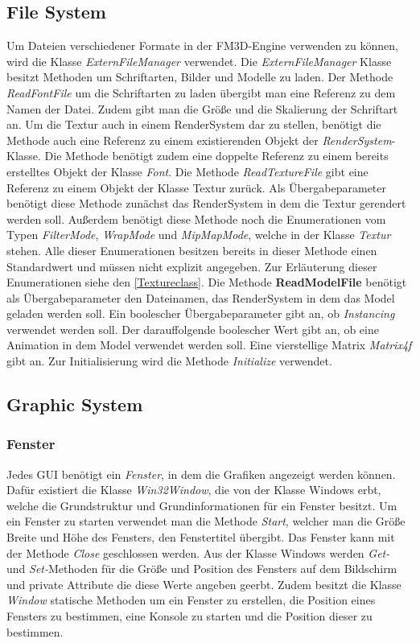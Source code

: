 \subsection{File System}
Um Dateien verschiedener Formate in der FM3D-Engine verwenden zu können, wird die Klasse \textit{ExternFileManager} verwendet.
Die \textit{ExternFileManager} Klasse besitzt Methoden um Schriftarten, Bilder und Modelle zu laden. Der Methode \textit{ReadFontFile} um die Schriftarten zu laden übergibt man eine Referenz zu dem Namen der Datei. Zudem gibt man die Größe und die Skalierung der Schriftart an. Um die Textur auch in einem RenderSystem dar zu stellen, benötigt die Methode auch eine Referenz zu einem existierenden Objekt der \textit{RenderSystem}-Klasse. Die Methode benötigt zudem eine doppelte Referenz zu einem bereits erstelltes Objekt der Klasse \textit{Font}. 
Die Methode \textit{ReadTextureFile} gibt eine Referenz zu einem Objekt der Klasse Textur zurück. Als Übergabeparameter benötigt diese Methode zunächst das RenderSystem in dem die Textur gerendert werden soll. Außerdem benötigt diese Methode noch  die Enumerationen vom Typen \textit{FilterMode}, \textit{WrapMode} und \textit{MipMapMode}, welche in der Klasse \textit{Textur} stehen. Alle dieser Enumerationen besitzen bereits in dieser Methode einen Standardwert und müssen nicht explizit angegeben. Zur Erläuterung dieser Enumerationen siehe den \cref{Textureclass}. 
Die Methode \textbf{ReadModelFile} benötigt als Übergabeparameter den Dateinamen, das RenderSystem in dem das Model geladen werden soll. Ein boolescher Übergabeparameter gibt an, ob \textit{Instancing} verwendet werden soll. Der darauffolgende  boolescher Wert gibt an, ob eine Animation in dem Model verwendet werden soll. Eine vierstellige Matrix \textit{Matrix4f} gibt \todo[inline]{!!!} an.
Zur Initialisierung wird die Methode \textit{Initialize} verwendet.

\subsection{Graphic System}

\subsubsection{Fenster}
Jedes GUI benötigt ein \textit{Fenster}, in dem die Grafiken angezeigt werden können. Dafür existiert die Klasse \textit{Win32Window}, die von der Klasse Windows erbt, welche die Grundstruktur und Grundinformationen für ein Fenster besitzt. 
Um ein Fenster zu starten verwendet man die Methode \textit{Start}, welcher man die Größe Breite und Höhe des Fensters, den Fenstertitel übergibt. Das Fenster kann mit der Methode \textit{Close} geschlossen werden.
Aus der Klasse Windows werden \textit{Get-} und \textit{Set-}Methoden für die Größe und Position des Fensters auf dem Bildschirm und private Attribute die diese Werte angeben geerbt.
Zudem besitzt die Klasse \textit{Window} statische Methoden um ein Fenster zu erstellen, die Position eines Fensters zu bestimmen, eine Konsole zu starten und die Position dieser zu bestimmen.

